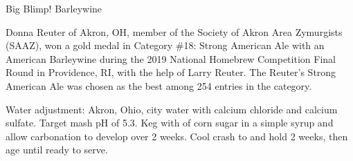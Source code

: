 \stylesection{\styleamericanbarleywine}

\begin{recipie}{Big Blimp! Barleywine}

\begin{aboutblock}
Donna Reuter of Akron, OH, member of the Society of Akron Area Zymurgists (SAAZ),
won a gold medal in Category \#18: Strong American Ale with an American Barleywine
during the 2019 National Homebrew Competition Final Round in Providence, RI, with
the help of Larry Reuter. The Reuter's Strong American Ale was chosen as the best
among 254 entries in the category.
\sourceaha
\end{aboutblock}


\begin{methodandtiming}
 
\begin{mashsteps}
\end{mashsteps}

\begin{fermentationsteps}

\end{fermentationsteps}

\begin{directions}
Water adjustment: Akron, Ohio, city water with  calcium chloride and
 calcium sulfate. Target mash pH of 5.3. Keg with 
of corn sugar in a simple syrup and allow carbonation to develop over 2 weeks.
Cool crash to  and hold 2 weeks, then age until ready to serve.
\end{directions}

\end{methodandtiming}

\pagebreak

\begin{ingredientsblock}

\begin{malts}
\end{malts}


\end{ingredientsblock}
\end{recipie}
